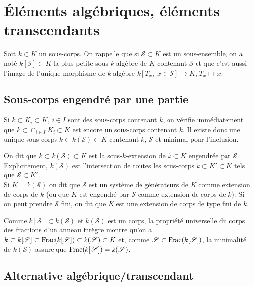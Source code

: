 \section{Éléments algébriques, éléments transcendants}

Soit $k\subset K$ un sous-corps. On rappelle que si
$\mathscr{S}\subset K$ est un sous-ensemble, on a noté
$k[\mathscr{S}]\subset K$ la plus petite sous-$k$-algèbre de $K$
contenant $\mathscr{S}$ et que c'est aussi l'image de l'unique
morphisme de $k$-algèbre $ k[T_x,\; x\in \mathscr{S}]\rightarrow K$,
$T_x\mapsto x $.\\


\subsection{Sous-corps engendré par une partie}

Si $k\subset K_i\subset K$, $i\in I$ sont des sous-corps contenant
$k$, on vérifie immédiatement que
$k\subset \cap_{i\in I}K_i\subset K $ est encore un sous-corps
contenant $k$. Il existe donc une unique sous-corps
$k\subset k(\mathscr{S})\subset K$ contenant $k$, $\mathscr{S}$ et
minimal pour l'inclusion.

\begin{definition}
  On dit que $k\subset k(\mathscr{S})\subset K$ est la
  sous-$k$-extension de $k\subset K$ engendrée par
  $\mathscr{S}$. Explicitement, $k(\mathscr{S})$ est l'intersection de
  toutes les sous-corps $k\subset K'\subset K$ tels
  que $\mathscr{S}\subset K'$.\\
  Si $K=k(\mathscr{S})$ on dit que $\mathscr{S}$ est un système de
  générateurs de $K$ comme extension de corps de $k$ (ou que $K$ est
  engendré par $\mathscr{S}$ comme extension de corps de $k$). Si on
  peut prendre $\mathscr{S}$ fini, on dit que $K$ est une extension de
  corps de type fini de $k$.
\end{definition}

Comme $k[\mathscr{S}]\subset k(\mathscr{S})$ et $k(\mathscr{S})$ est
un corps, la propriété universelle du corps des fractions d'un anneau
intègre montre qu'on a
$k\subset k[\mathscr{S}]\subset \operatorname{Frac}(k[\mathscr{S}])\subset
k(\mathscr{S})\subset K$ et, comme
$\mathscr{S}\subset \operatorname{Frac}(k[\mathscr{S}])$, la minimalité de
$k(\mathscr{S})$ assure que
$\operatorname{Frac}(k[\mathscr{S}])=k(\mathscr{S})$. \\


\subsection{Alternative algébrique/transcendant}\label{AlgTr}

